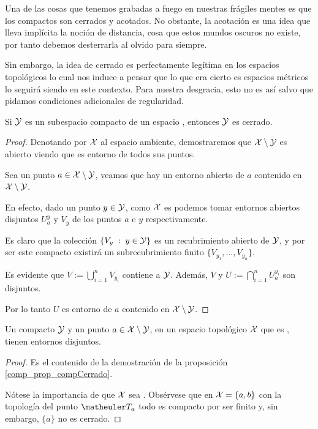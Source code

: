 Una de las cosas que tenemos grabadas a fuego en nuestras frágiles mentes es que los compactos son cerrados y acotados. No obstante, la acotación es una idea que lleva implícita la noción de distancia, cosa que estos mundos oscuros no existe, por tanto debemos desterrarla al olvido para siempre.

Sin embargo, la idea de cerrado es perfectamente legítima en los espacios topológicos lo cual nos induce a pensar que lo que era cierto es espacios métricos lo seguirá siendo en este contexto. Para nuestra desgracia, esto no es así salvo que pidamos condiciones adicionales de regularidad.

\begin{prop}\label{comp_prop_compCerrado}
	Si $\mathcal{Y}$ es un subespacio compacto de un espacio  \hausdorff, entonces $\mathcal{Y}$ es cerrado.
\end{prop}
\begin{proof}
	Denotando por $\mathcal{X}$ al espacio \hausdorff ambiente, demostraremos que $\mathcal{X}\setminus \mathcal{Y}$ es abierto viendo que es entorno de todos sus puntos.
	
	Sea un punto $a\in\mathcal{X}\setminus \mathcal{Y}$, veamos que hay un entorno abierto de $a$ contenido en $\mathcal{X}\setminus \mathcal{Y}$.
	
	En efecto, dado un punto $y \in \mathcal{Y}$, como $\mathcal{X}$ es \hausdorff podemos tomar entornos abiertos disjuntos $U_a^y$ y $V_y$ de los puntos $a$ e $y$ respectivamente.
	
	Es claro que la colección $\{V_y \;:\; y \in \mathcal{Y}\}$ es un recubrimiento abierto de $\mathcal{Y}$, y por ser este compacto existirá un subrecubrimiento finito $\{V_{y_1},\dots,V_{y_n}\}$.
	
	Es evidente que $V:=\bigcup_{i=1}^nV_{y_i}$ contiene a $\mathcal{Y}$. Además, $V$ y $U := \bigcap_{i=1}^nU_a^{y_i}$ son disjuntos.
	
	Por lo tanto $U$ es entorno de $a$ contenido en $\mathcal{X}\setminus\mathcal{Y}$.
\end{proof}
\begin{cor}
	\label{comp_obs_compSep}
	Un compacto $\mathcal{Y}$ y un punto $a\in \mathcal{X}\setminus \mathcal{Y}$, en un espacio topológico $\mathcal{X}$ que es \hausdorff, tienen entornos disjuntos.
\end{cor}
\begin{proof}
	Es el contenido de la demostración de la proposición \ref{comp_prop_compCerrado}.
	
	Nótese la importancia de que $\mathcal{X}$ sea \hausdorff. Obsérvese que en $\mathcal{X}=\{a,b\}$ con la topología del punto $\T_a$ todo es compacto por ser finito y, sin embargo, $\{a\}$ no es cerrado.
\end{proof}
